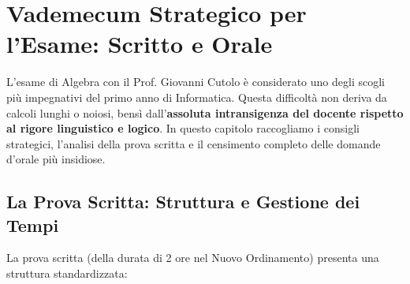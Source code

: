 \chapter{Vademecum Strategico per l'Esame: Scritto e Orale}
\label{chap:guida_esame}

L'esame di Algebra con il Prof. Giovanni Cutolo è considerato uno degli scogli più impegnativi del primo anno di Informatica. Questa difficoltà non deriva da calcoli lunghi o noiosi, bensì dall'\textbf{assoluta intransigenza del docente rispetto al rigore linguistico e logico}. In questo capitolo raccogliamo i consigli strategici, l'analisi della prova scritta e il censimento completo delle domande d'orale più insidiose.

\section{La Prova Scritta: Struttura e Gestione dei Tempi}

La prova scritta (della durata di 2 ore nel Nuovo Ordinamento) presenta una struttura standardizzata:

